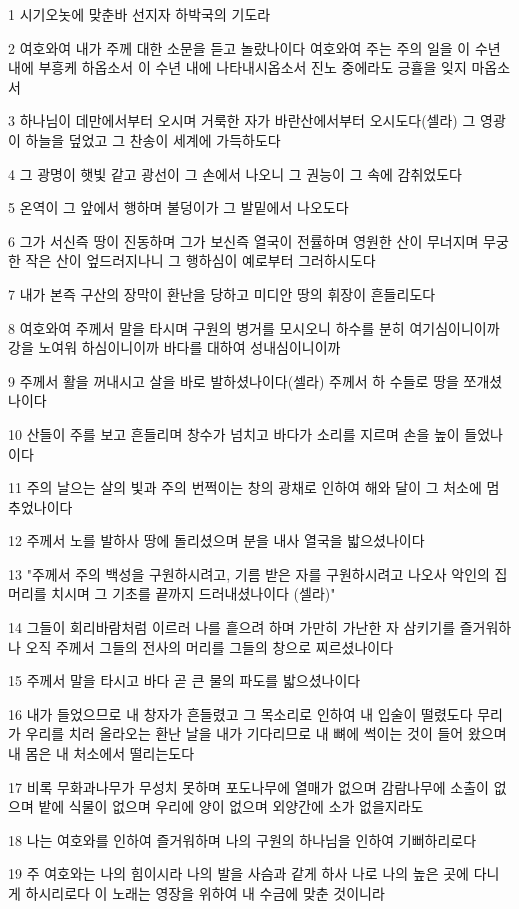 \par 1 시기오놋에 맞춘바 선지자 하박국의 기도라
\par 2 여호와여 내가 주께 대한 소문을 듣고 놀랐나이다 여호와여 주는 주의 일을 이 수년 내에 부흥케 하옵소서 이 수년 내에 나타내시옵소서 진노 중에라도 긍휼을 잊지 마옵소서
\par 3 하나님이 데만에서부터 오시며 거룩한 자가 바란산에서부터 오시도다(셀라) 그 영광이 하늘을 덮었고 그 찬송이 세계에 가득하도다
\par 4 그 광명이 햇빛 같고 광선이 그 손에서 나오니 그 권능이 그 속에 감취었도다
\par 5 온역이 그 앞에서 행하며 불덩이가 그 발밑에서 나오도다
\par 6 그가 서신즉 땅이 진동하며 그가 보신즉 열국이 전률하며 영원한 산이 무너지며 무궁한 작은 산이 엎드러지나니 그 행하심이 예로부터 그러하시도다
\par 7 내가 본즉 구산의 장막이 환난을 당하고 미디안 땅의 휘장이 흔들리도다
\par 8 여호와여 주께서 말을 타시며 구원의 병거를 모시오니 하수를 분히 여기심이니이까 강을 노여워 하심이니이까 바다를 대하여 성내심이니이까
\par 9 주께서 활을 꺼내시고 살을 바로 발하셨나이다(셀라) 주께서 하 수들로 땅을 쪼개셨나이다
\par 10 산들이 주를 보고 흔들리며 창수가 넘치고 바다가 소리를 지르며 손을 높이 들었나이다
\par 11 주의 날으는 살의 빛과 주의 번쩍이는 창의 광채로 인하여 해와 달이 그 처소에 멈추었나이다
\par 12 주께서 노를 발하사 땅에 돌리셨으며 분을 내사 열국을 밟으셨나이다
\par 13 "주께서 주의 백성을 구원하시려고, 기름 받은 자를 구원하시려고 나오사 악인의 집머리를 치시며 그 기초를 끝까지 드러내셨나이다 (셀라)"
\par 14 그들이 회리바람처럼 이르러 나를 흩으려 하며 가만히 가난한 자 삼키기를 즐거워하나 오직 주께서 그들의 전사의 머리를 그들의 창으로 찌르셨나이다
\par 15 주께서 말을 타시고 바다 곧 큰 물의 파도를 밟으셨나이다
\par 16 내가 들었으므로 내 창자가 흔들렸고 그 목소리로 인하여 내 입술이 떨렸도다 무리가 우리를 치러 올라오는 환난 날을 내가 기다리므로 내 뼈에 썩이는 것이 들어 왔으며 내 몸은 내 처소에서 떨리는도다
\par 17 비록 무화과나무가 무성치 못하며 포도나무에 열매가 없으며 감람나무에 소출이 없으며 밭에 식물이 없으며 우리에 양이 없으며 외양간에 소가 없을지라도
\par 18 나는 여호와를 인하여 즐거워하며 나의 구원의 하나님을 인하여 기뻐하리로다
\par 19 주 여호와는 나의 힘이시라 나의 발을 사슴과 같게 하사 나로 나의 높은 곳에 다니게 하시리로다 이 노래는 영장을 위하여 내 수금에 맞춘 것이니라


